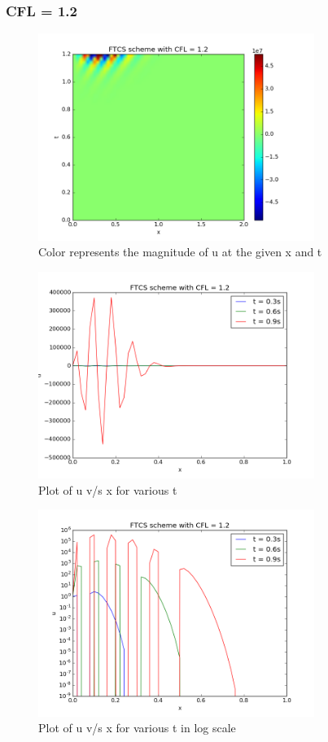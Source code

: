 \documentclass[11pt, a4paper]{article}
\begin{document}
\subsubsection{CFL = 1.2}
\begin{figure}[H]
 \centering
 \includegraphics[width = 0.8\textwidth]{FTCS1_12.png}
 \caption{Color represents the magnitude of u at the given x and t}
\end{figure}

\begin{figure}[H]
 \centering
 \includegraphics[width = 0.8\textwidth]{FTCS1_12_1.png}
 \caption{Plot of u v/s x for various t}
\end{figure}

\begin{figure}[H]
 \centering
 \includegraphics[width = 0.8\textwidth]{FTCS1_12_1_log.png}
 \caption{Plot of u v/s x for various t in log scale}
\end{figure}
\end{document}
